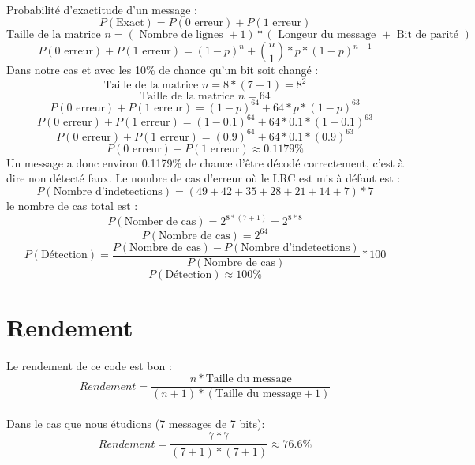         \paragraph{}
Probabilité d'exactitude d'un message :
\[  P(\text{Exact}) = P(\text{0 erreur}) + P(\text{1 erreur}) \]
\[ \text{Taille de la matrice } n = ( \text{ Nombre de lignes } + 1 ) * ( \text{ Longeur du message } + \text{ Bit de parité } ) \]
\[ P(\text{0 erreur}) + P(\text{1 erreur}) = (1-p)^{n} + {n\choose 1}*p*(1-p)^{n-1} \]
Dans notre cas et avec les 10\% de chance qu'un bit soit changé :
\[ \text{Taille de la matrice } n = 8*(7+1) = 8^{2} \]
\[ \text{Taille de la matrice } n = 64 \]
\[ P(\text{0 erreur}) + P(\text{1 erreur}) = (1-p)^{64} + 64*p*(1-p)^{63} \]
\[ P(\text{0 erreur}) + P(\text{1 erreur}) = (1-0.1)^{64} + 64*0.1*(1-0.1)^{63} \]
\[ P(\text{0 erreur}) + P(\text{1 erreur}) = (0.9)^{64} + 64*0.1*(0.9)^{63} \]
\[ P(\text{0 erreur}) + P(\text{1 erreur}) \approx 0.1179\% \]
Un message a donc environ 0.1179\% de chance d'être décodé correctement, c'est à dire non détecté faux.
Le nombre de cas d'erreur où le LRC est mis à défaut est :
\[  P(\text{Nombre d'indetections}) = (49+42+35+28+21+14+7)*7 \]
le nombre de cas total est  :
\[  P(\text{Nomber de cas}) = 2^{8*(7+1)} = 2^{8*8} \]
\[  P(\text{Nombre de cas}) = 2^{64} \]
\[  P(\text{Détection}) = \frac{P(\text{Nombre de cas}) - P(\text{Nombre d'indetections})}{P(\text{Nombre de cas})}*100 \]
\[  P(\text{Détection}) \approx 100\% \]


    \section{Rendement}

        \paragraph{}
Le rendement de ce code est bon :
\[  Rendement = \frac{n*\text{Taille du message}}{(n+1)*(\text{Taille du message}+1)} \]
        \paragraph{}
Dans le cas que nous étudions (7 messages de 7 bits):
\[  Rendement = \frac{7*7}{(7+1)*(7+1)} \approx 76.6\% \]
